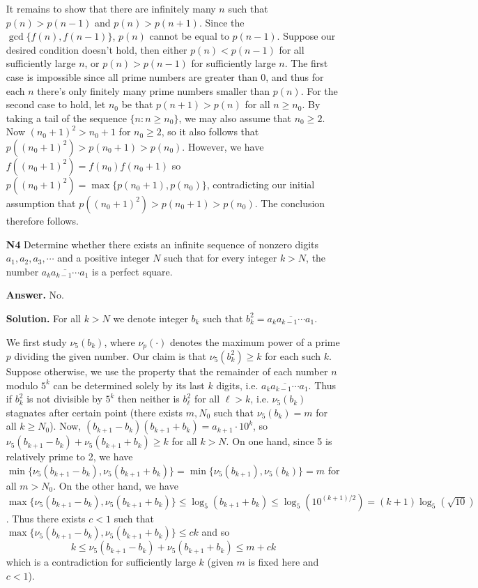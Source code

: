\documentclass[11pt,a4paper]{article}
\begin{document}
\begin{enumerate}
	It remains to show that there are infinitely many $n$ such that $p(n)>p(n-1)$ and $p(n)>p(n+1)$. 
	Since the $\gcd\{f(n), f(n-1)\}$, $p(n)$ cannot be equal to $p(n-1)$. 
	Suppose our desired condition doesn't hold, then either $p(n)<p(n-1)$ for all sufficiently large $n$, or $p(n)>p(n-1)$ for sufficiently large $n$. The first case is impossible since all prime numbers are greater than 0, and thus for each $n$ there's only finitely many prime numbers smaller than $p(n)$. 
	For the second case to hold, let $n_0$ be that $p(n+1)>p(n)$ for all $n\ge n_0$. 
	By taking a tail of the sequence $\{n: n\ge n_0\}$, we may also assume that $n_0\ge 2$. 
	Now $(n_0+1)^2>n_0+1$ for $n_0\ge 2$, so it also follows that $p((n_0+1)^2)>p(n_0+1)>p(n_0)$. 
	However, we have $f((n_0+1)^2)=f(n_0)f(n_0+1)$ so $p((n_0+1)^2)=\max\{p(n_0+1), p(n_0)\}$, contradicting our initial assumption that $p((n_0+1)^2)>p(n_0+1)>p(n_0)$. The conclusion therefore follows. 
	
	\item[\textbf{N4}] Determine whether there exists an infinite sequence of nonzero digits $a_1 , a_2 , a_3 , \cdots $ and a positive integer $N$ such that for every integer $k > N$, the number $\overline{a_k a_{k-1}\cdots a_1 }$ is a perfect square.
	
	\textbf{Answer.} No. 
	
	\textbf{Solution.} For all $k > N$ we denote integer $b_k$ such that $b_k^2 = \overline{a_k a_{k-1}\cdots a_1 }$. 
	
	We first study $\nu_5(b_k)$, where $\nu_p(\cdot)$ denotes the maximum power of a prime $p$ dividing the given number. 
    Our claim is that $\nu_5(b_k^2)\ge k$ for each such $k$. 
    Suppose otherwise, we use the property that the remainder of each number $n$ modulo $5^k$ can be determined solely by its last $k$ digits, i.e. $\overline{a_k a_{k-1}\cdots a_1 }$. 
    Thus if $b_k^2$ is not divisible by $5^k$ then neither is $b_{\ell}^2$ for all $\ell > k$, 
    i.e. $\nu_5(b_k)$ stagnates after certain point (there exists $m, N_0$ such that $\nu_5(b_k)=m$ for all $k\ge N_0$). 
    Now, 
    $(b_{k+1}-b_k)(b_{k+1}+b_k)=a_{k+1}\cdot 10^k$, so 
    $\nu_5(b_{k+1} - b_k) + \nu_5(b_{k+1} + b_k) \ge k$ for all $k > N$. 
    On one hand, since 5 is relatively prime to 2, we have $\min \{\nu_5(b_{k+1} - b_k), \nu_5(b_{k+1} + b_k)\}=\min \{\nu_5(b_{k+1}), \nu_5(b_k)\}=m$ for all $m > N_0$. 
    On the other hand, we have $\max\{\nu_5(b_{k+1} - b_k), \nu_5(b_{k+1} + b_k)\}
    \le \log_5(b_{k+1} + b_k)\le \log_5(10^{(k+1)/2})=(k+1)\log_5(\sqrt{10})$. 
    Thus there exists $c < 1$ such that $\max\{\nu_5(b_{k+1} - b_k), \nu_5(b_{k+1} + b_k)\} \le ck$ and so 
    \[
    k \le \nu_5(b_{k+1} - b_k) + \nu_5(b_{k+1} + b_k) 
    \le m + ck
    \]
    which is a contradiction for sufficiently large $k$ (given $m$ is fixed here and $c < 1$). 
    

\end{enumerate}
\end{document}
